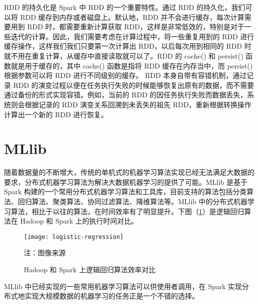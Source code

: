 RDD 的持久化是 Spark 中 RDD 的一个重要特性。通过 RDD 的持久化，我们可以将 RDD 缓存到内存或者磁盘上。默认地，RDD 并不会进行缓存，每次计算需要用到 RDD 时，都需要重新计算获取 RDD，这样是非常低效的，特别是对于一些迭代的计算。因此，我们需要考虑在计算过程中，将一些重复用到的 RDD 进行缓存操作，这样我们我们只要第一次计算出 RDD，以后每次用到相同的 RDD 时就不用在重复计算，从缓存中直接读取就可以了。RDD 的 cache() 和 persist() 函数就是用于缓存的，其中 cache() 函数是指将 RDD 缓存在内存当中，而 persist() 根据参数可以将 RDD 进行不同级别的缓存。
RDD 本身自带有容错机制，通过记录 RDD 的演变过程以便在任务执行失败的时候能够恢复出原有的数据，而不需要通过备份的形式实现容错。例如，当前的 RDD 的因任务执行失败而数据丢失，系统则会根据记录的 RDD 演变关系回溯到未丢失的祖先 RDD，重新根据转换操作计算出一个新的 RDD 进行恢复。
\section{MLlib}
随着数据量的不断增大，传统的单机式的机器学习算法实现已经无法满足大数据的要求，分布式机器学习算法为解决大数据机器学习的提供了可能。MLlib 是基于 Spark 构建的一个常用分布式机器学习算法和工具库，目前支持的算法包括分类算法、回归算法、聚类算法、协同过滤算法、降维算法等。MLlib 中的分布式机器学习算法，相比于以往的算法，在时间效率有了明显提升。下图（\ref{fig:logistic-regression}）是逻辑回归算法在 Hadoop 和 Spark 上的执行时间对比。
\begin{figure}[H]
  \centering
  \texttt{[image: logistic-regression]}
  \caption{Hadoop 和 Spark 上逻辑回归算法效率对比}
  \label{fig:logistic-regression}
  \footnotesize 注：图像来源\protect\footnotemark
\end{figure}
MLlib 中已经实现的一些常用机器学习算法可以供使用者调用，在 Spark 实现分布式地实现大规模数据的机器学习的任务正是一个不错的选择。

